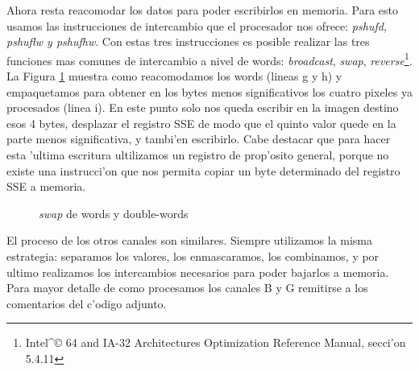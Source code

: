 Ahora resta reacomodar los datos para poder escribirlos en memoria. Para esto usamos las instrucciones de intercambio que el procesador nos ofrece: \textit{pshufd, pshuflw y pshufhw}. Con estas tres instrucciones es posible realizar las tres funciones mas comunes de intercambio a nivel de words: \textit{broadcast}, \textit{swap}, \textit{reverse}\footnote{Intel^{\copyright} 64 and IA-32 Architectures Optimization Reference Manual, secci'on 5.4.11}. La Figura \ref{est:separar-3} muestra como reacomodamos los words (lineas g y h) y empaquetamos para obtener en los bytes menos significativos los cuatro pixeles ya procesados (linea i). En este punto solo nos queda escribir en la imagen destino esos 4 bytes, desplazar el registro SSE de modo que el quinto valor quede en la parte menos significativa, y tambi'en escribirlo. Cabe destacar que para hacer esta 'ultima escritura ultilizamos un registro de prop'osito general, porque no existe una instrucci'on que nos permita copiar un byte determinado del registro SSE a memoria.

\begin{figure}[ht]
\caption{\textit{swap} de words y double-words}
\label{est:separar-3}
\end{figure}

El proceso de los otros canales son similares. Siempre utilizamos la misma estrategia: separamos los valores, los enmascaramos, los combinamos, y por ultimo realizamos los intercambios necesarios para poder bajarlos a memoria. Para mayor detalle de como procesamos los canales B y G remitirse a los comentarios del c'odigo adjunto.


